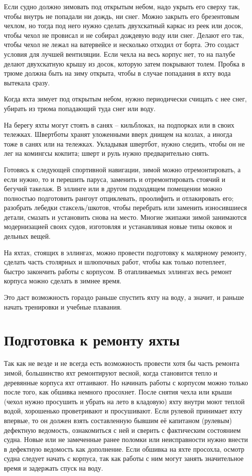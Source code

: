 \documentclass[a4paper, 12pt, twoside, final]{scrbook}
\begin{document}
Если судно должно зимовать под открытым небом, надо укрыть его сверху так, чтобы внутрь не попадали ни дождь, ни снег. Можно закрыть его брезентовым чехлом, но тогда под него нужно сделать двухскатный каркас из реек или досок, чтобы чехол не провисал и не собирал дождевую воду или снег. Делают его так, чтобы чехол не лежал на ватервейсе и несколько отходил от борта. Это создаст условия для лучшей вентиляции. Если чехла на весь корпус нет, то на палубе делают двухскатную крышу из досок, которую затем покрывают толем. Пробка в трюме должна быть на зиму открыта, чтобы в случае попадания в яхту вода вытекала сразу.

Когда яхта зимует под открытым небом, нужно периодически счищать с нее снег, убирать из трюма попадающий туда снег или воду.

На берегу яхты могут стоять в санях \--- кильблоках, на подпорках или в своих тележках. Швертботы хранят уложенными вверх днищем на козлах, а иногда тоже в санях или на тележках. Укладывая швертбот, нужно следить, чтобы он не лег на комингсы кокпита; шверт и руль нужно предварительно снять.

Готовясь к следующей спортивной навигации, зимой можно отремонтировать, а если нужно, то и перешить паруса, заменить и отремонтировать стоячий и бегучий такелаж. В эллинге или в другом подходящем помещении можно полностью подготовить рангоут отциклевать, проолифить и отлакировать его; разобрать лебедки стаксель\-/шкотов, чтобы перебрать или заменить износившиеся детали, смазать и установить снова на место. Многие экипажи зимой занимаются модернизацией своих судов, изготовляя и устанавливая новые типы оковок и дельных вещей.

На яхтах, стоящих в эллингах, можно провести подготовку к малярному ремонту, сделать часть столярных и шлюпочных работ, чтобы как только потеплеет, быстро закончить работы с корпусом. В отапливаемых эллингах весь ремонт корпуса можно сделать в зимнее время.

Это даст возможность гораздо раньше спустить яхту на воду, а значит, и раньше начать тренировки и учебные плавания.

\section{Подготовка к ремонту яхты}

Так как не везде и не всегда есть возможность провести хотя бы часть ремонта зимой, большинство яхт ремонтируют весной, когда становится тепло и деревянные корпуса яхт оттаивают. Но начинать работы с корпусом можно только после того, как обшивка немного просохнет. После снятия чехла или крыши (чехол нужно просушить и убрать на лето в кладовую) яхту внутри моют теплой водой, хорошенько проветривают и просушивают. Если рулевой принимает яхту впервые, то он должен взять составленную бывшим её капитаном (рулевым) дефектную ведомость, ознакомиться с ней и сверить с фактическим состоянием судна. Новые или не замеченные ранее поломки или неисправности нужно внести в дефектную ведомость как дополнение. Если обшивка на яхте просохла, осмотр судна следует начать с корпуса, так как работы с ним могут занять значительное время и задержать спуск на воду.
\end{document}
